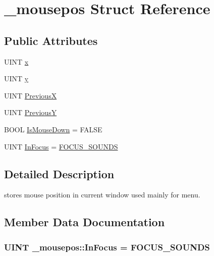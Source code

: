 \hypertarget{struct__mousepos}{}\section{\+\_\+mousepos Struct Reference}
\label{struct__mousepos}
\subsection*{Public Attributes}
\begin{DoxyCompactItemize}
\item 
U\+I\+N\+T \hyperlink{struct__mousepos_a49dba96a4968f24e0096f5bda7bd7799}{x}
\item 
U\+I\+N\+T \hyperlink{struct__mousepos_a97dc4bc172c95859002071bdef22f69f}{y}
\item 
U\+I\+N\+T \hyperlink{struct__mousepos_a8f9021f7beef9b25242f39e602e71257}{Previous\+X}
\item 
U\+I\+N\+T \hyperlink{struct__mousepos_a1dc599d3383f2062ecb0a8f5ddfc0449}{Previous\+Y}
\item 
B\+O\+O\+L \hyperlink{struct__mousepos_a367af11c4d4e4776d55ba54412162ba5}{Is\+Mouse\+Down} = F\+A\+L\+S\+E
\item 
U\+I\+N\+T \hyperlink{struct__mousepos_aff068d47c159bb8983b1ecefd38c3091}{In\+Focus} = \hyperlink{_b_o_w-a_01film_01guessing_01game_8cpp_ac69dbc130f2f432ad3ea0e1bb14d6e67}{F\+O\+C\+U\+S\+\_\+\+S\+O\+U\+N\+D\+S}
\end{DoxyCompactItemize}


\subsection{Detailed Description}
stores mouse position in current window used mainly for menu. 

\subsection{Member Data Documentation}
\hypertarget{struct__mousepos_aff068d47c159bb8983b1ecefd38c3091}{}
\subsubsection[{In\+Focus}]{\setlength{\rightskip}{0pt plus 5cm}U\+I\+N\+T \+\_\+mousepos\+::\+In\+Focus = {\bf F\+O\+C\+U\+S\+\_\+\+S\+O\+U\+N\+D\+S}}\label{struct__mousepos_aff068d47c159bb8983b1ecefd38c3091}
\hypertarget{struct__mousepos_a367af11c4d4e4776d55ba54412162ba5}{}
